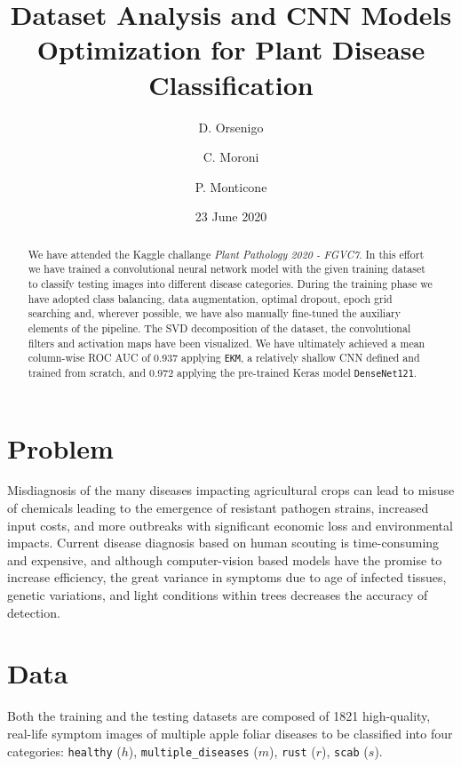 \documentclass[aps,twocolumn,secnumarabic,nobalancelastpage,amsmath,amssymb,
nofootinbib]{revtex4}
\begin{document}
\title{Dataset Analysis and CNN Models Optimization for Plant Disease
	Classification}
\author {D. Orsenigo}
\author {C. Moroni}
\author {P. Monticone}

\date{23 June 2020}
\begin{abstract}
	We have attended the Kaggle challange \emph{Plant Pathology 2020 -
		FGVC7}. In this effort we have trained a convolutional neural network
	model with the given training dataset to classify testing images into
	different disease categories. During the training phase we have adopted
	class balancing, data augmentation, optimal dropout, epoch grid
	searching and, wherever possible, we have also manually fine-tuned the
	auxiliary elements of the pipeline. The SVD decomposition of the
	dataset, the convolutional filters and activation maps have been
	visualized. We have ultimately achieved a mean column-wise ROC AUC of
	0.937 applying \texttt{EKM}, a relatively shallow CNN defined and
	trained from scratch, and 0.972 applying the pre-trained Keras model
	\texttt{DenseNet121}.
\end{abstract}
\maketitle
\tableofcontents

\section{Problem}
Misdiagnosis of the many diseases impacting agricultural crops can lead to misuse of chemicals leading to the emergence of resistant pathogen strains, increased input costs, and more outbreaks with significant economic loss and environmental impacts. Current disease diagnosis based on human scouting is time-consuming and expensive, and although computer-vision based models have the promise to increase efficiency, the great variance in symptoms due to age of infected tissues, genetic variations, and light conditions within trees decreases the accuracy of detection.

\section{Data}
Both the training and the testing datasets are composed of 1821
high-quality, real-life symptom images of multiple apple foliar diseases
to be classified into four categories: \texttt{healthy} (\(h\)),
\texttt{multiple\_diseases} (\(m\)), \texttt{rust} (\(r\)),
\texttt{scab} (\(s\)). 
\end{document}
